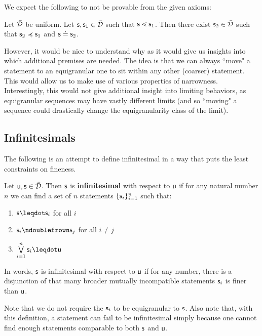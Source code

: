 \documentclass[10pt, onecolumn, longbibliography, nofootinbib]{revtex4-2}
\begin{document}
We expect the following to not be provable from the given axioms:

\begin{desid}\label{uniformconsequence}
    Let $\tdomain$ be uniform. Let $\stmt, \stmt_1 \in \tdomain$ such that $\stmt \sfiner \stmt_1$. Then there exist $\stmt_2 \in \tdomain$ such that $\stmt_2 \narrower \stmt_1$ and $\stmt \eqgran \stmt_2$.
\end{desid}
However, it would be nice to understand why as it would give us insights into which additional premises are needed. The idea is that we can always ``move" a statement to an equigranular one to sit within any other (coarser) statement. This would allow us to make use of various properties of narrowness. Interestingly, this would not give additional insight into limiting behaviors, as equigranular sequences may have vastly different limits (and so ``moving" a sequence could drastically change the equigranularity class of the limit).


\subsection{Infinitesimals}

The following is an attempt to define infinitesimal in a way that puts the least constraints on fineness.

\begin{defn}\label{infinitesimals}
	Let $\stmt[u],\stmt[s] \in \tdomain$. Then $\stmt$ is \textbf{infinitesimal} with respect to $\stmt[u]$ if for any natural number $n$ we can find a set of $n$ statements $\{ \stmt_i \}_{i=1}^n$ such that:
	\begin{enumerate}
		\item $\stmt \finer \stmt_i$ for all $i$
		\item $\stmt_i \ncomp \stmt_j$ for all $i \neq j$
		\item $\bigOR\limits_{i=1}^n \stmt_i \finer \stmt[u]$ 
	\end{enumerate}
	In words, $\stmt$ is infinitesimal with respect to $\stmt[u]$ if for any number, there is a disjunction of that many broader mutually incompatible statements $\stmt_i$ is finer than $\stmt[u]$.
\end{defn}

\begin{remark}
	Note that we do not require the $\stmt_i$ to be equigranular to $\stmt$. Also note that, with this definition, a statement can fail to be infinitesimal simply because one cannot find enough statements comparable to both $\stmt$ and $\stmt[u]$.
\end{remark}
\end{document}
